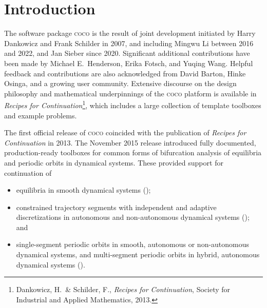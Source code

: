  

\section{Introduction}
The software package \textsc{coco} is the result of joint development initiated by Harry Dankowicz and Frank Schilder in 2007, and including Mingwu Li between 2016 and 2022, and Jan Sieber since 2020. Significant additional contributions have been made by Michael E.~Henderson, Erika Fotsch, and Yuqing Wang. Helpful feedback and contributions are also acknowledged from David Barton, Hinke Osinga, and a growing user community. Extensive discourse on the design philosophy and mathematical underpinnings of the \textsc{coco} platform is available in \emph{Recipes for Continuation}\footnote{Dankowicz, H.~\& Schilder, F., \emph{Recipes for Continuation}, Society for Industrial and Applied Mathematics, 2013.}, which includes a large collection of template toolboxes and example problems.

The first official release of \textsc{coco} coincided with the publication of \emph{Recipes for Continuation} in 2013. The November 2015 release introduced fully documented, production-ready toolboxes for common forms of bifurcation analysis of equilibria and periodic orbits in dynamical systems. These provided support for continuation of
\begin{itemize}
\item equilibria in smooth dynamical systems ();
\item constrained trajectory segments with independent and adaptive discretizations in autonomous and non-autonomous dynamical systems (); and
\item single-segment periodic orbits in smooth, autonomous or non-autonomous dynamical systems, and multi-segment periodic orbits in hybrid, autonomous dynamical systems ().
\end{itemize} 

